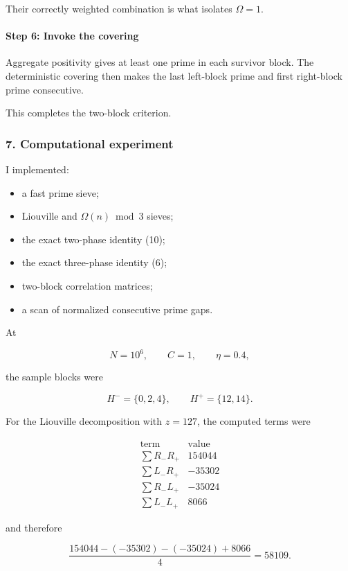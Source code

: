 Their correctly weighted combination is what isolates \(\Omega=1\).

\paragraph{Step 6: Invoke the covering}

Aggregate positivity gives at least one prime in each survivor block. The deterministic covering then makes the last left-block prime and first right-block prime consecutive.

This completes the two-block criterion.

\medskip
\medskip


\subsubsection*{7. Computational experiment}

I implemented:

\begin{itemize}
\item a fast prime sieve;
\item Liouville and \(\Omega(n)\bmod3\) sieves;
\item the exact two-phase identity (10);
\item the exact three-phase identity (6);
\item two-block correlation matrices;
\item a scan of normalized consecutive prime gaps.
\end{itemize}

At

\[
N=10^6,\qquad C=1,\qquad \eta=0.4,
\]

the sample blocks were

\[
H^-=\{0,2,4\},
\qquad
H^+=\{12,14\}.
\]

For the Liouville decomposition with \(z=127\), the computed terms were

\[
\begin{array}{c|r}
\text{term}&\text{value}\\ \hline
\sum R_-R_+&154044\\
\sum L_-R_+&-35302\\
\sum R_-L_+&-35024\\
\sum L_-L_+&8066
\end{array}
\]

and therefore

\[
\frac{154044-(-35302)-(-35024)+8066}{4}
=
58109.
\]

